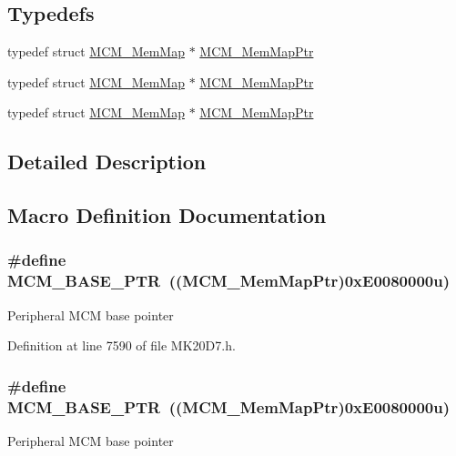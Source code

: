 \subsection*{Typedefs}
\begin{DoxyCompactItemize}
\item 
typedef struct \hyperlink{struct_m_c_m___mem_map}{M\+C\+M\+\_\+\+Mem\+Map} $\ast$ \hyperlink{group___m_c_m___peripheral_ga72e8bbe428d9410917903164d3a5f675}{M\+C\+M\+\_\+\+Mem\+Map\+Ptr}
\item 
typedef struct \hyperlink{struct_m_c_m___mem_map}{M\+C\+M\+\_\+\+Mem\+Map} $\ast$ \hyperlink{group___m_c_m___peripheral_ga72e8bbe428d9410917903164d3a5f675}{M\+C\+M\+\_\+\+Mem\+Map\+Ptr}
\item 
typedef struct \hyperlink{struct_m_c_m___mem_map}{M\+C\+M\+\_\+\+Mem\+Map} $\ast$ \hyperlink{group___m_c_m___peripheral_ga72e8bbe428d9410917903164d3a5f675}{M\+C\+M\+\_\+\+Mem\+Map\+Ptr}
\end{DoxyCompactItemize}


\subsection{Detailed Description}


\subsection{Macro Definition Documentation}
\subsubsection[{\texorpdfstring{M\+C\+M\+\_\+\+B\+A\+S\+E\+\_\+\+P\+TR}{MCM_BASE_PTR}}]{\setlength{\rightskip}{0pt plus 5cm}\#define M\+C\+M\+\_\+\+B\+A\+S\+E\+\_\+\+P\+TR~(({\bf M\+C\+M\+\_\+\+Mem\+Map\+Ptr})0x\+E0080000u)}\hypertarget{group___m_c_m___peripheral_gad41e931f176c230831e3dbad45117841}{}\label{group___m_c_m___peripheral_gad41e931f176c230831e3dbad45117841}
Peripheral M\+CM base pointer 

Definition at line 7590 of file M\+K20\+D7.\+h.

\subsubsection[{\texorpdfstring{M\+C\+M\+\_\+\+B\+A\+S\+E\+\_\+\+P\+TR}{MCM_BASE_PTR}}]{\setlength{\rightskip}{0pt plus 5cm}\#define M\+C\+M\+\_\+\+B\+A\+S\+E\+\_\+\+P\+TR~(({\bf M\+C\+M\+\_\+\+Mem\+Map\+Ptr})0x\+E0080000u)}\hypertarget{group___m_c_m___peripheral_gad41e931f176c230831e3dbad45117841}{}\label{group___m_c_m___peripheral_gad41e931f176c230831e3dbad45117841}
Peripheral M\+CM base pointer 

